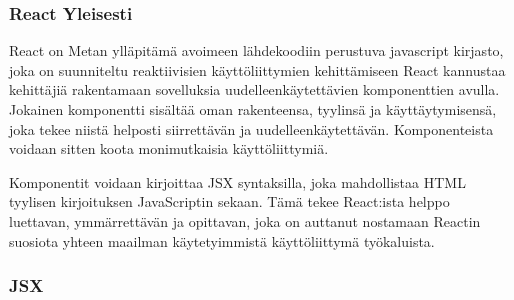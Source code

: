 

\subsubsection{React Yleisesti}















React on Metan ylläpitämä avoimeen lähdekoodiin perustuva javascript kirjasto,
joka on suunniteltu reaktiivisien käyttöliittymien kehittämiseen
React kannustaa kehittäjiä rakentamaan sovelluksia uudelleenkäytettävien komponenttien avulla.
Jokainen komponentti sisältää oman rakenteensa, tyylinsä ja käyttäytymisensä, joka tekee niistä helposti siirrettävän ja uudelleenkäytettävän.
Komponenteista voidaan sitten koota monimutkaisia käyttöliittymiä. 
\medskip


Komponentit voidaan kirjoittaa JSX syntaksilla, joka mahdollistaa HTML tyylisen kirjoituksen JavaScriptin sekaan.
Tämä tekee React:ista helppo luettavan, ymmärrettävän ja opittavan,
joka on auttanut nostamaan Reactin suosiota yhteen maailman käytetyimmistä käyttöliittymä työkaluista.
\medskip









\subsubsection{JSX}






